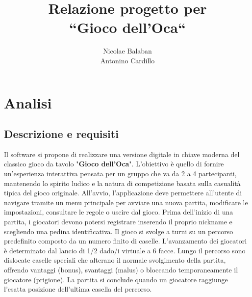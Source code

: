 \documentclass[a4paper,12pt]{report}
\title{Relazione progetto per\\``Gioco dell'Oca``}
\author{Nicolae Balaban\\ Antonino Cardillo}
\date{\DTMdate{2026-10-01}}
\begin{document}
\maketitle

\tableofcontents

\chapter{Analisi}

\section{Descrizione e requisiti}

Il software si propone di realizzare una versione digitale in chiave moderna del classico gioco da tavolo "\textbf{Gioco dell'Oca}". L'obiettivo è quello di fornire un'esperienza interattiva pensata per un gruppo che va da 2 a 4 partecipanti, mantenendo lo spirito ludico e la natura di competizione basata sulla casualità tipica del gioco originale. All'avvio, l'applicazione deve permettere all'utente di navigare tramite un menu principale per avviare una nuova partita, modificare le impostazioni, consultare le regole o uscire dal gioco. Prima dell'inizio di una partita, i giocatori devono potersi registrare inserendo il proprio nickname e scegliendo una pedina identificativa. Il gioco si svolge a turni su un percorso predefinito composto da un numero finito di caselle. L'avanzamento dei giocatori è determinato dal lancio di 1/2 dado/i virtuale a 6 facce. Lungo il percorso sono dislocate caselle speciali che alterano il normale svolgimento della partita, offrendo vantaggi (bonus), svantaggi (malus) o bloccando temporaneamente il giocatore (prigione). La partita si conclude quando un giocatore raggiunge l'esatta posizione dell'ultima casella del percorso.
\end{document}
